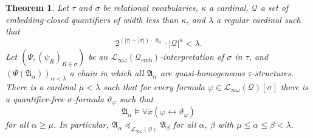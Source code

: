 \documentclass{ndjflart}
\theoremstyle{plain}
\newtheorem{theorem}[conjecture]{Theorem}
\theoremstyle{definition}
\numberwithin{equation}{section}
\DeclareMathOperator{\emb}{emb}
\begin{document}
\begin{theorem}\label{infinite}
Let $\tau$ and $\sigma$ be relational vocabularies, $\kappa$ a cardinal, 
$\mathcal{Q}$ a set of embedding-closed quantifiers of width less than $\kappa$, 
and $\lambda$ a regular cardinal such that
\[
	2^{(|\tau| + |\sigma|) \cdot \aleph_0} \cdot |\mathcal{Q}|^{\kappa} < \lambda.
\]
Let $(\Psi, (\psi_R)_{R \in \sigma})$ be an
$\mathcal{L}_{\infty \omega}(\mathcal{Q}_{\emb})$-interpretation of
$\sigma$ in $\tau$, and $(\Psi(\mathfrak{A}_{\alpha}))_{\alpha < \lambda}$
a chain in which all $\mathfrak{A}_{\alpha}$ are quasi-homogeneous 
$\tau$-structures.
There is a cardinal $\mu<\lambda$ such that for every formula
$\varphi \in \mathcal{L}_{\infty\omega}(\mathcal{Q})[\sigma]$ 
there is a quantifier-free
$\sigma$-formula $\vartheta_{\varphi}$ such that
\[
	\mathfrak{A}_{\alpha} \vDash \forall \overline{x}(\varphi 
	\leftrightarrow \vartheta_{\varphi})
\]
for all $\alpha \geq \mu$.
In particular,
$\mathfrak{A}_{\alpha} \preceq_{\mathcal{L}_{\infty\omega}(\mathcal{Q})} 
\mathfrak{A}_{\beta}$
for all $\alpha$, $\beta$ with $\mu \leq \alpha \leq \beta < \lambda$.
\end{theorem}
\end{document}
